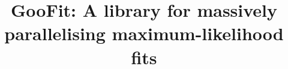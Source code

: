 \title{GooFit: A library for massively parallelising maximum-likelihood fits}

\author{}
\address{$^1$ University of Cincinnati, 2600 Clifton Avenue, Cincinnati OH 45220, USA}
\address{$^2$ Ohio Supercomputer Center, 1224 Kinnear Road, Columbus OH 43212, USA}
